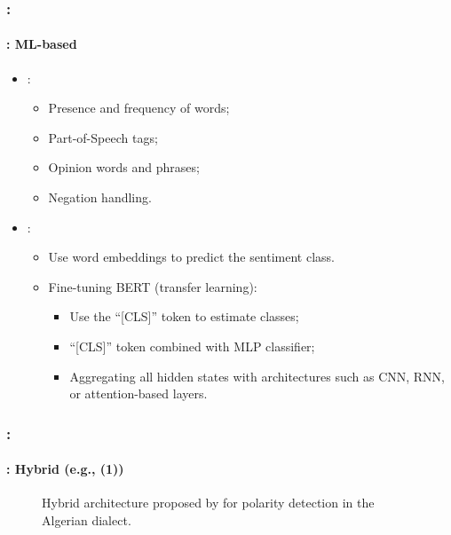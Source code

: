\documentclass[xcolor=table]{beamer}
\begin{document}
\begin{frame}
	\frametitle{\insertshortsubtitle: \insertsection}
	\framesubtitle{\insertsubsection: ML-based}
	
	\begin{itemize}
		\item {}:
		\begin{itemize}
			\item Presence and frequency of words;
			\item Part-of-Speech tags;
			\item Opinion words and phrases;
			\item Negation handling.
		\end{itemize}
		\item {}:
		\begin{itemize}
			\item Use word embeddings to predict the sentiment class.
			\item Fine-tuning BERT (transfer learning):
			\begin{itemize}
				\item Use the ``[CLS]'' token to estimate classes;
				\item ``[CLS]'' token combined with MLP classifier;
				\item Aggregating all hidden states with architectures such as CNN, RNN, or attention-based layers.
			\end{itemize}
		\end{itemize}
	\end{itemize}
	
\end{frame}

\begin{frame}
	\frametitle{\insertshortsubtitle: \insertsection}
	\framesubtitle{\insertsubsection: Hybrid (e.g., \cite{18-bettiche-al} (1))}
	
	\begin{figure}
		\centering
		\caption{Hybrid architecture proposed by \cite{18-bettiche-al} for polarity detection in the Algerian dialect.}
	\end{figure}
	
\end{frame}
\end{document}
